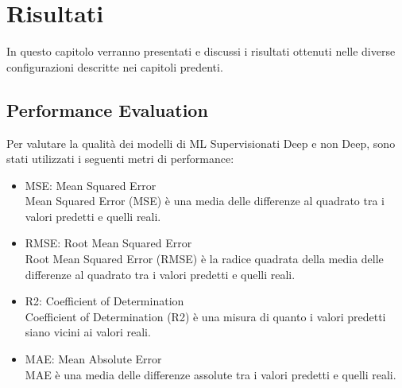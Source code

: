 \documentclass[../../Report.tex]{subfiles}
\begin{document}
\chapter{Risultati}
In questo capitolo verranno presentati e discussi i risultati ottenuti nelle diverse configurazioni descritte nei capitoli predenti.

\section{Performance Evaluation}
Per valutare la qualità dei modelli di ML Supervisionati Deep e non Deep, sono stati utilizzati i seguenti metri di performance:
\begin{itemize}
    \item MSE: Mean Squared Error\\Mean Squared Error (MSE) è una media delle differenze al quadrato tra i valori predetti e quelli reali.
    \item RMSE: Root Mean Squared Error\\ Root Mean Squared Error (RMSE) è la radice quadrata della media delle differenze al quadrato tra i valori predetti e quelli reali.
    \item R2: Coefficient of Determination\\ Coefficient of Determination (R2) è una misura di quanto i valori predetti siano vicini ai valori reali.
    \item MAE: Mean Absolute Error\\ MAE è una media delle differenze assolute tra i valori predetti e quelli reali.
\end{itemize}
\end{document}
